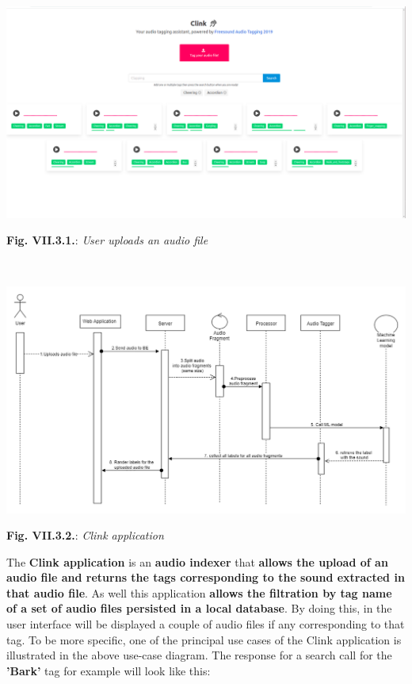 \documentclass[11pt, a4papper]{report}
\theoremstyle{plain}
\theoremstyle{definition}
\theoremstyle{definition}
\theoremstyle{proposition}
\begin{document}
\begin{center}
\includegraphics[scale=0.26]{click-app-fe.png}
\end{center}
\begin{center}
\textbf{Fig. VII.3.1.}: \textit{User uploads an audio file}
\end{center}
\

\begin{center}
\includegraphics[scale=0.45]{user-uploads-audio.png}
\end{center}
\begin{center}
\textbf{Fig. VII.3.2.}: \textit{Clink application}
\end{center}

The \textbf{Clink application} is an \textbf{audio indexer} that \textbf{allows the upload of an audio file and returns the tags corresponding to the sound extracted in that audio file}. As well this application \textbf{allows the filtration by tag name of a set of audio files persisted in a local database}. By doing this, in the user interface will be displayed a couple of audio files if any corresponding to that tag. To be more specific, one of the principal use cases of the Clink application is illustrated in the above use-case diagram.  The response for a search call for the \textbf{'Bark'} tag for example will look like this:
\end{document}

